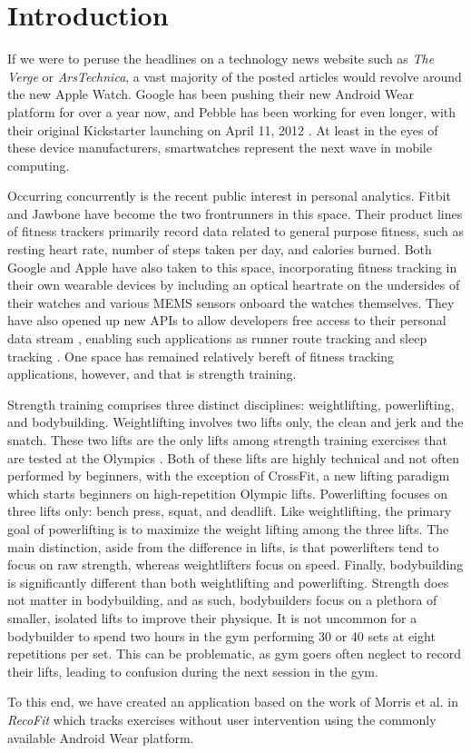 \chapter{Introduction}

If we were to peruse the headlines on a technology news website such as \textit{The Verge} or \textit{ArsTechnica}, a vast majority of the posted articles would revolve around the new Apple Watch. Google has been pushing their new Android Wear platform for over a year now, and Pebble has been working for even longer, with their original Kickstarter launching on April 11, 2012 \cite{Intro:pebble}. At least in the eyes of these device manufacturers, smartwatches represent the next wave in mobile computing. 

Occurring concurrently is the recent public interest in personal analytics. Fitbit and Jawbone have become the two frontrunners in this space. Their product lines of fitness trackers primarily record data related to general purpose fitness, such as resting heart rate, number of steps taken per day, and calories burned. Both Google and Apple have also taken to this space, incorporating fitness tracking in their own wearable devices by including an optical heartrate on the undersides of their watches and various MEMS sensors onboard the watches themselves. They have also opened up new APIs to allow developers free access to their personal data stream \cite{Intro:googleapi, Intro:appleapi}, enabling such applications as runner route tracking and sleep tracking \cite{Intro:strava, Intro:sleeptracker}. One space has remained relatively bereft of fitness tracking applications, however, and that is strength training.

Strength training comprises three distinct disciplines: weightlifting, powerlifting, and bodybuilding. Weightlifting involves two lifts only, the clean and jerk and the snatch. These two lifts are the only lifts among strength training exercises that are tested at the Olympics \cite{Intro:olympics}. Both of these lifts are highly technical and not often performed by beginners, with the exception of CrossFit, a new lifting paradigm which starts beginners on high-repetition Olympic lifts. Powerlifting focuses on three lifts only: bench press, squat, and deadlift. Like weightlifting, the primary goal of powerlifting is to maximize the weight lifting among the three lifts. The main distinction, aside from the difference in lifts, is that powerlifters tend to focus on raw strength, whereas weightlifters focus on speed. Finally, bodybuilding is significantly different than both weightlifting and powerlifting. Strength does not matter in bodybuilding, and as such, bodybuilders focus on a plethora of smaller, isolated lifts to improve their physique. It is not uncommon for a bodybuilder to spend two hours in the gym performing 30 or 40 sets at eight repetitions per set. This can be problematic, as gym goers often neglect to record their lifts, leading to confusion during the next session in the gym. 

To this end, we have created an application based on the work of Morris et al. in \textit{RecoFit} \cite{recofit} which tracks exercises without user intervention using the commonly available Android Wear platform. 